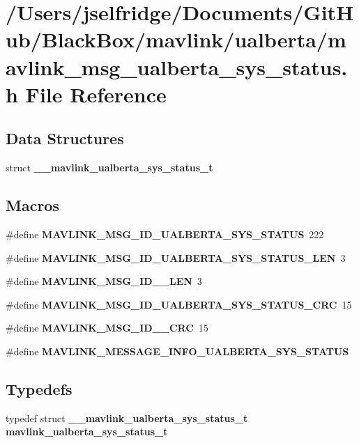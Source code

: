\section{/\+Users/jselfridge/\+Documents/\+Git\+Hub/\+Black\+Box/mavlink/ualberta/mavlink\+\_\+msg\+\_\+ualberta\+\_\+sys\+\_\+status.h File Reference}
\label{mavlink__msg__ualberta__sys__status_8h}
\subsection*{Data Structures}
\begin{DoxyCompactItemize}
\item 
struct \textbf{ \+\_\+\+\_\+mavlink\+\_\+ualberta\+\_\+sys\+\_\+status\+\_\+t}
\end{DoxyCompactItemize}
\subsection*{Macros}
\begin{DoxyCompactItemize}
\item 
\#define \textbf{ M\+A\+V\+L\+I\+N\+K\+\_\+\+M\+S\+G\+\_\+\+I\+D\+\_\+\+U\+A\+L\+B\+E\+R\+T\+A\+\_\+\+S\+Y\+S\+\_\+\+S\+T\+A\+T\+US}~222
\item 
\#define \textbf{ M\+A\+V\+L\+I\+N\+K\+\_\+\+M\+S\+G\+\_\+\+I\+D\+\_\+\+U\+A\+L\+B\+E\+R\+T\+A\+\_\+\+S\+Y\+S\+\_\+\+S\+T\+A\+T\+U\+S\+\_\+\+L\+EN}~3
\item 
\#define \textbf{ M\+A\+V\+L\+I\+N\+K\+\_\+\+M\+S\+G\+\_\+\+I\+D\+\_\+\_\+\+L\+EN}~3
\item 
\#define \textbf{ M\+A\+V\+L\+I\+N\+K\+\_\+\+M\+S\+G\+\_\+\+I\+D\+\_\+\+U\+A\+L\+B\+E\+R\+T\+A\+\_\+\+S\+Y\+S\+\_\+\+S\+T\+A\+T\+U\+S\+\_\+\+C\+RC}~15
\item 
\#define \textbf{ M\+A\+V\+L\+I\+N\+K\+\_\+\+M\+S\+G\+\_\+\+I\+D\+\_\+\_\+\+C\+RC}~15
\item 
\#define \textbf{ M\+A\+V\+L\+I\+N\+K\+\_\+\+M\+E\+S\+S\+A\+G\+E\+\_\+\+I\+N\+F\+O\+\_\+\+U\+A\+L\+B\+E\+R\+T\+A\+\_\+\+S\+Y\+S\+\_\+\+S\+T\+A\+T\+US}
\end{DoxyCompactItemize}
\subsection*{Typedefs}
\begin{DoxyCompactItemize}
\item 
typedef struct \textbf{ \+\_\+\+\_\+mavlink\+\_\+ualberta\+\_\+sys\+\_\+status\+\_\+t} \textbf{ mavlink\+\_\+ualberta\+\_\+sys\+\_\+status\+\_\+t}
\end{DoxyCompactItemize}


